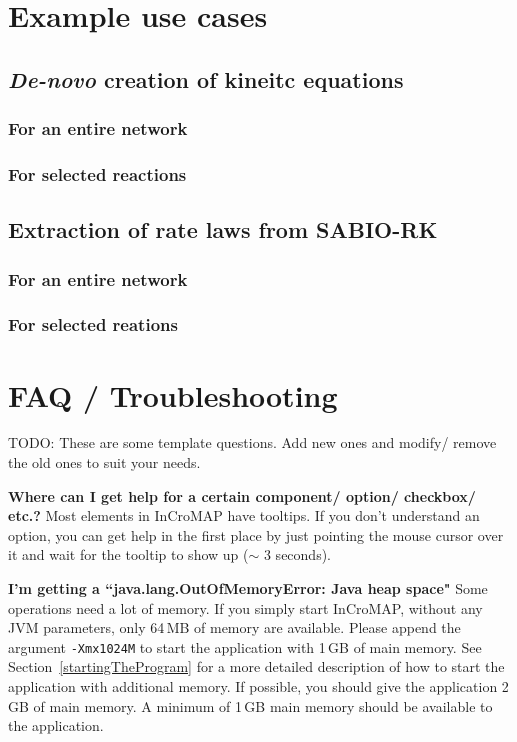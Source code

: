 \chapter{Example use cases}

\section{\emph{De-novo} creation of kineitc equations}
\subsection{For an entire network}
\subsection{For selected reactions}
\section{Extraction of rate laws from SABIO-RK}
\subsection{For an entire network}
\subsection{For selected reations}

\chapter{FAQ / Troubleshooting}
\label{ch:faq}

TODO: These are some template questions. Add new ones and modify/ remove the
old ones to suit your needs.

\noindent \textbf{Where can I get help for a certain component/ option/ checkbox/ etc.?}\newline
Most elements in InCroMAP have tooltips. If you don't understand an option, you
can get help in the first place by just pointing the mouse cursor over it and
wait for the tooltip to show up ($\sim$ 3 seconds).\newline

\noindent \textbf{I'm getting a ``java.lang.OutOfMemoryError: Java heap space"}\newline
Some operations need a lot of memory. If you simply start InCroMAP, without any
JVM parameters, only 64\,MB of memory are available. Please append the argument
\texttt{-Xmx1024M} to start the application with 1\,GB of main memory. See
Section~\vref{startingTheProgram} for a more detailed description of how to
start the application with additional memory. If possible, you should give the
application 2\,GB of main memory. A minimum of 1\,GB main memory should be
available to the application.\newline

